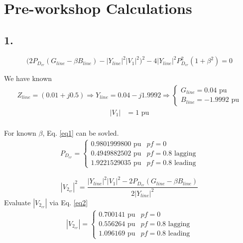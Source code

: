 \documentclass{article}
\begin{document}
\section*{Pre-workshop Calculations}

\subsection*{1.}
\begin{equation}\label{eq1}
\Big( 2 P_{D_{cr}} (G_{line} - \beta B_{line}) - |Y_{line}|^2 |V_1|^2 \Big)^2 - 4 |Y_{line}|^2 P_{D_{cr}}^2 (1 + \beta^2) = 0
\end{equation}

We have known
\begin{align*}
Z_{line} = (0.01 + j0.5)
\Longrightarrow Y_{line} = 0.04 - j1.9992
\Longrightarrow
\begin{cases}
G_{line} = 0.04 \text{ pu}\\
B_{line} = -1.9992 \text{ pu}
\end{cases}
\end{align*}
\begin{align*}
|V_1| &= 1 \text{ pu}\\
\end{align*}

For known $\beta$, Eq. \ref{eq1} can be sovled.
\begin{align*}
P_{D_{cr}} =
\begin{cases}
0.9801999800 \text{ pu} &pf = 0\\
0.4949882502 \text{ pu} &pf = 0.8 \text{ lagging}\\
1.9221529035 \text{ pu} &pf = 0.8 \text{ leading}
\end{cases}
\end{align*}

\begin{equation}\label{eq2}
|V_{2_{cr}}|^2 = \frac{|Y_{line}|^2 |V_1|^2 - 2 P_{D_{cr}} (G_{line} - \beta B_{line})}{2 |Y_{line}|^2}
\end{equation}
Evaluate $|V_{2_{cr}}|$ via Eq. \ref{eq2}
\begin{align*}
|V_{2_{cr}}| =
\begin{cases}
0.700141 \text{ pu} &pf = 0\\
0.556264 \text{ pu} &pf = 0.8 \text{ lagging}\\
1.096169 \text{ pu} &pf = 0.8 \text{ leading}
\end{cases}
\end{align*}
\end{document}
